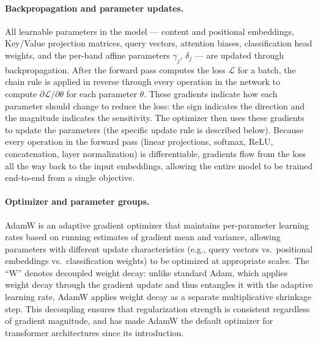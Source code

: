 \documentclass[11pt]{report}
\begin{document}
\paragraph{Backpropagation and parameter updates.}
All learnable parameters in the model --- content and positional embeddings, Key/Value projection matrices, query vectors, attention biases, classification head weights, and the per-band affine parameters $\gamma_j$, $\delta_j$ --- are updated through backpropagation. After the forward pass computes the loss $\mathcal{L}$ for a batch, the chain rule is applied in reverse through every operation in the network to compute $\partial \mathcal{L} / \partial \theta$ for each parameter $\theta$. These gradients indicate how each parameter should change to reduce the loss: the sign indicates the direction and the magnitude indicates the sensitivity. The optimizer then uses these gradients to update the parameters (the specific update rule is described below). Because every operation in the forward pass (linear projections, softmax, ReLU, concatenation, layer normalization) is differentiable, gradients flow from the loss all the way back to the input embeddings, allowing the entire model to be trained end-to-end from a single objective.

\paragraph{Optimizer and parameter groups.}
AdamW \cite{loshchilov2019adamw} is an adaptive gradient optimizer that maintains per-parameter learning rates based on running estimates of gradient mean and variance, allowing parameters with different update characteristics (e.g., query vectors vs.\ positional embeddings vs.\ classification weights) to be optimized at appropriate scales. The ``W'' denotes decoupled weight decay: unlike standard Adam, which applies weight decay through the gradient update and thus entangles it with the adaptive learning rate, AdamW applies weight decay as a separate multiplicative shrinkage step. This decoupling ensures that regularization strength is consistent regardless of gradient magnitude, and has made AdamW the default optimizer for transformer architectures since its introduction.
\end{document}
